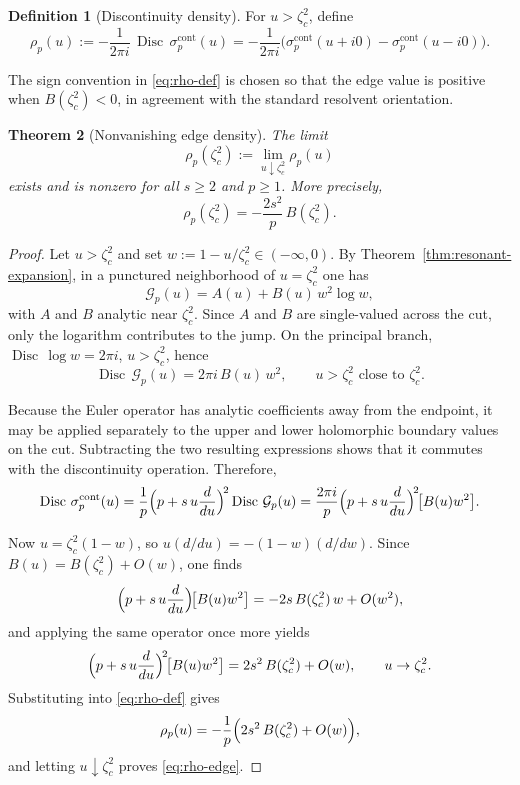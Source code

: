 \documentclass[11pt]{amsart}
\numberwithin{equation}{section}
\theoremstyle{plain}
\newtheorem{theorem}{Theorem}[section]
\theoremstyle{definition}
\newtheorem{definition}[theorem]{Definition}
\theoremstyle{remark}
\DeclareMathOperator{\Disc}{Disc}
\begin{document}
\begin{definition}[Discontinuity density]
	\label{def:discontinuity}
	For \(u>\zeta_c^2\), define
	\begin{equation}\label{eq:rho-def}
		\rho_p(u)
		:=
		-\frac{1}{2\pi i}\,\Disc\,\sigma_p^{\mathrm{cont}}(u)
		=
		-\frac{1}{2\pi i}
		\bigl(\sigma_p^{\mathrm{cont}}(u+i0)-\sigma_p^{\mathrm{cont}}(u-i0)\bigr).
	\end{equation}
\end{definition}

The sign convention in \eqref{eq:rho-def} is chosen so that the edge value is
positive when \(B(\zeta_c^2)<0\), in agreement with the standard resolvent
orientation.

\begin{theorem}[Nonvanishing edge density]
	\label{thm:edge-density}
	The limit
	\[
		\rho_p(\zeta_c^2)
		:=
		\lim_{u\downarrow\zeta_c^2}\rho_p(u)
	\]
	exists and is nonzero for all \(s\ge2\) and \(p\ge1\). More precisely,
	\begin{equation}\label{eq:rho-edge}
		\rho_p(\zeta_c^2)
		=
		-\frac{2s^2}{p}\,B(\zeta_c^2).
	\end{equation}
\end{theorem}

\begin{proof}
	Let \(u>\zeta_c^2\) and set $w:=1- u / \zeta_c^2\in(-\infty,0)$.
	By Theorem~\ref{thm:resonant-expansion}, in a punctured neighborhood of
	\(u=\zeta_c^2\) one has
	\[
		\mathcal G_p(u)=A(u)+B(u)\,w^2\log w,
	\]
	with \(A\) and \(B\) analytic near \(\zeta_c^2\). Since \(A\) and \(B\) are
	single-valued across the cut, only the logarithm contributes to the jump.
	On the principal branch, $\Disc\,\log w = 2\pi i$, $u>\zeta_c^2$,
	hence
	\begin{equation}\label{eq:disc-Gp-local}
		\Disc\,\mathcal G_p(u)=2\pi i\,B(u)\,w^2,
		\qquad u>\zeta_c^2 \text{ close to }\zeta_c^2.
	\end{equation}

	Because the Euler operator has analytic coefficients away from the endpoint,
	it may be applied separately to the upper and lower holomorphic boundary
	values on the cut. Subtracting the two resulting expressions shows that it
	commutes with the discontinuity operation. Therefore,
	\[
		\Disc\,\sigma_p^{\mathrm{cont}}(u)
		=
		\frac1p\Bigl(p+s\,u\frac{d}{du}\Bigr)^{\!2}\Disc\,\mathcal G_p(u)
		=
		\frac{2\pi i}{p}
		\Bigl(p+s\,u\frac{d}{du}\Bigr)^{\!2}\!\bigl[B(u)w^2\bigr].
	\]

	Now \(u=\zeta_c^2(1-w)\), so $
		u(d/du)=-(1-w)(d/dw)$.
	Since \(B(u)=B(\zeta_c^2)+O(w)\), one finds
	\[
		\Bigl(p+s\,u\frac{d}{du}\Bigr)\!\bigl[B(u)w^2\bigr]
		=
		-2s\,B(\zeta_c^2)\,w+O(w^2),
	\]
	and applying the same operator once more yields
	\begin{equation}\label{eq:Euler-on-w2}
		\Bigl(p+s\,u\frac{d}{du}\Bigr)^{\!2}\!\bigl[B(u)w^2\bigr]
		=
		2s^2\,B(\zeta_c^2)+O(w),
		\qquad u\to\zeta_c^2.
	\end{equation}
	Substituting into \eqref{eq:rho-def} gives
	\[
		\rho_p(u)
		=
		-\frac1p\Bigl(2s^2\,B(\zeta_c^2)+O(w)\Bigr),
	\]
	and letting \(u\downarrow\zeta_c^2\) proves \eqref{eq:rho-edge}.
\end{proof}
\end{document}
